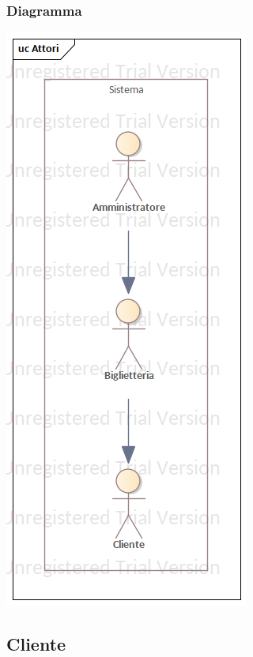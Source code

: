 \documentclass{article}
\begin{document}
            \subsubsection{Diagramma}
                \includegraphics{imgs/use_case/attori}

        \subsection{Cliente}
\end{document}
